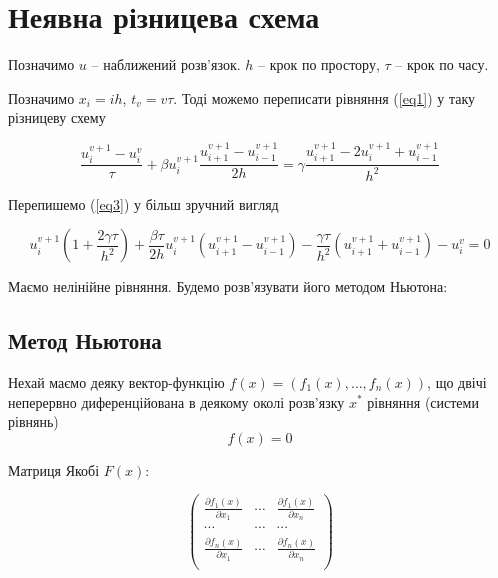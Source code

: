 \documentclass[a4paper,12pt]{article}
\begin{document}
\section{Неявна різницева схема}

Позначимо $u$ -- наближений розв'язок. $h$ -- крок по простору, $\tau$ -- крок по часу.

Позначимо $x_i = ih$, $t_v = v \tau$. Тоді можемо переписати рівняння (\ref{eq1}) у таку різницеву схему

\begin{equation} \label{eq3}
	\frac{u_i^{v+1} - u_i^{v}}{\tau} + \beta u^{v+1}_{i} \frac{u^{v+1}_{i+1} - u^{v+1}_{i-1}}{2h} = \gamma \frac{u^{v+1}_{i+1} - 2 u^{v+1}_{i} + u^{v+1}_{i-1}}{h^2}
\end{equation}

Перепишемо (\ref{eq3}) у більш зручний вигляд

\begin{equation} \label{eq4}
	u^{v+1}_{i} \left(1 + \frac{2 \gamma \tau}{h^2} \right) + \frac{\beta \tau}{2h} u^{v+1}_{i} \left( u^{v+1}_{i+1} - u^{v+1}_{i-1} \right) - \frac{\gamma \tau}{h^2} \left( u^{v+1}_{i+1} + u^{v+1}_{i-1} \right) - u^{v}_{i} =0
\end{equation}

Маємо нелінійне рівняння. Будемо розв'язувати його методом Ньютона:

\subsection{Метод Ньютона}

Нехай маємо деяку вектор-функцію $f(x) = \left(f_1(x), \ldots, f_n(x)\right)$, що двічі неперервно диференційована в деякому околі розв'язку $x^*$ рівняння (системи рівнянь)
\begin{displaymath}
	f(x) = 0
\end{displaymath}

Матриця Якобі $F(x)$:

\begin{displaymath}
	\begin{pmatrix}
	\frac{\partial f_1(x)}{\partial x_1} & \cdots & \frac{\partial f_1(x)}{\partial x_n} \\
	\cdots  & \cdots & \cdots\\
	\frac{\partial f_n(x)}{\partial x_1} & \cdots & \frac{\partial f_n(x)}{\partial x_n} \\
	\end{pmatrix}	
\end{displaymath}
\end{document}
